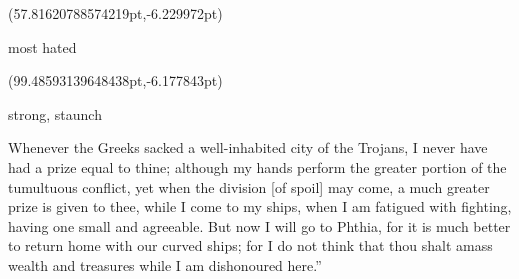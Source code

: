 \documentclass{ransom}
\begin{document}
\begin{foreignpage}
{\begin{textblock*}{43.27095pt}(57.81620788574219pt,\pdfpageheight-206.37759399414062pt-6.229972pt)\parbox[b]{43.27095pt}{\begin{blacktext}\begin{latin}most hated\end{latin}\end{blacktext}}\end{textblock*}
\begin{textblock*}{46.64723pt}(99.48593139648438pt,\pdfpageheight-152.37759399414062pt-6.177843pt)\parbox[b]{46.64723pt}{\begin{blacktext}\begin{latin}strong, staunch\end{latin}\end{blacktext}}\end{textblock*}
 }
\end{foreignpage}


Whenever the Greeks sacked a well-inhabited city of the
Trojans, I never have had a prize equal to thine; although my hands
perform the greater portion of the tumultuous conflict, yet when the
division [of spoil] may come, a much greater prize is given to thee,
while I come to my ships, when I am fatigued with fighting, having one
small and agreeable. But now I will go to Phthia, for it is much better
to return home with our curved ships; for I do not think that thou
shalt amass wealth and treasures while I am dishonoured here.”
\end{document}
